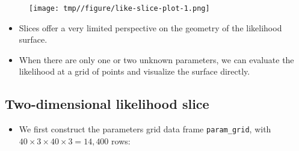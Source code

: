 \documentclass[
  letterpaper,
  DIV=11,
  numbers=noendperiod]{scrartcl}
\newenvironment{Shaded}{\begin{snugshade}}{\end{snugshade}}
\newcommand{\AttributeTok}[1]{\textcolor[rgb]{0.40,0.45,0.13}{#1}}
\newcommand{\DecValTok}[1]{\textcolor[rgb]{0.68,0.00,0.00}{#1}}
\newcommand{\FunctionTok}[1]{\textcolor[rgb]{0.28,0.35,0.67}{#1}}
\newcommand{\NormalTok}[1]{\textcolor[rgb]{0.00,0.23,0.31}{#1}}
\newcommand{\OtherTok}[1]{\textcolor[rgb]{0.00,0.23,0.31}{#1}}
\newcommand{\SpecialCharTok}[1]{\textcolor[rgb]{0.37,0.37,0.37}{#1}}
\newcommand{\StringTok}[1]{\textcolor[rgb]{0.13,0.47,0.30}{#1}}
\providecommand{\tightlist}{%
  \setlength{\itemsep}{0pt}\setlength{\parskip}{0pt}}\usepackage{longtable,booktabs,array}
\begin{document}
\begin{Shaded}
\end{Shaded}

\framebreak

\begin{figure}[h!]

{\centering \texttt{[image: tmp//figure/like-slice-plot-1.png]}

}

\end{figure}

\begin{itemize}
\tightlist
\item
  Slices offer a very limited perspective on the geometry of the
  likelihood surface.
\item
  When there are only one or two unknown parameters, we can evaluate the
  likelihood at a grid of points and visualize the surface directly.
\end{itemize}

\hypertarget{two-dimensional-likelihood-slice}{%
\subsection{Two-dimensional likelihood
slice}\label{two-dimensional-likelihood-slice}}

\begin{itemize}
\tightlist
\item
  We first construct the parameters grid data frame
  \texttt{param\_grid}, with \(40\times 3 \times 40\times 3=14,400\)
  rows:
\end{itemize}
\end{document}
